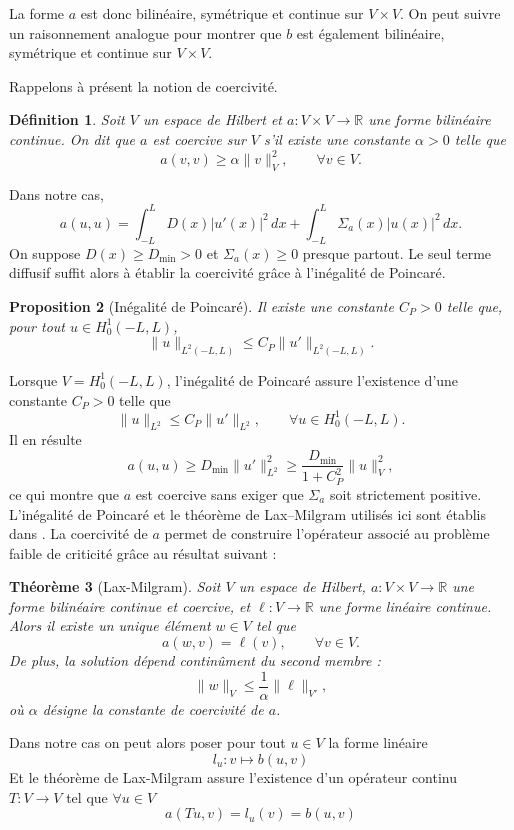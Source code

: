 \documentclass{article}
\newtheorem{theorem}{Théorème}[section]
\newtheorem{definition}[theorem]{Définition}
\newtheorem{proposition}[theorem]{Proposition}
\begin{document}
La forme $a$ est donc bilinéaire, symétrique et continue sur $V\times V$. On peut suivre un raisonnement analogue pour montrer que $b$ est également bilinéaire, symétrique et continue sur $V\times V$.

\medskip
Rappelons à présent la notion de coercivité. 
\begin{definition} 
    Soit $V$ un espace de Hilbert et $a : V\times V \rightarrow \mathbb{R}$ une forme bilinéaire continue. On dit que $a$ est coercive sur $V$ s'il existe une constante $\alpha>0$ telle que 
    \[ a(v,v)\ge \alpha \|v\|_V^2, \qquad \forall v\in V. \] 
\end{definition} 

Dans notre cas,
\[
a(u,u)=\int_{-L}^{L}D(x)|u'(x)|^2\,dx
+\int_{-L}^{L}\Sigma_a(x)|u(x)|^2\,dx.
\]
On suppose $D(x)\geq D_{\min}>0$ et $\Sigma_a(x)\geq0$ presque partout. Le seul terme diffusif suffit alors à établir la coercivité grâce à l'inégalité de Poincaré.

\begin{proposition}[Inégalité de Poincaré] 
Il existe une constante $C_P>0$ telle que, pour tout $u\in H_0^1(-L,L)$, 
\[ \|u\|_{L^2(-L,L)} \leq C_P \|u'\|_{L^2(-L,L)}. \] 
\end{proposition}


Lorsque $V=H_0^1(-L,L)$, l'inégalité de Poincaré assure l'existence d'une constante $C_P>0$ telle que
\[ \|u\|_{L^2}\le C_P \|u'\|_{L^2}, \qquad \forall u\in H_0^1(-L,L). \] 
Il en résulte
\[
a(u,u)\geq D_{\min}\|u'\|_{L^2}^2
\geq \frac{D_{\min}}{1+C_P^2}\|u\|_V^2,
\]
ce qui montre que $a$ est coercive sans exiger que $\Sigma_a$ soit strictement positive. L'inégalité de Poincaré et le théorème de Lax--Milgram utilisés ici sont établis dans \textcite{Brezis2011}.
La coercivité de $a$ permet de construire l'opérateur associé au problème faible de criticité grâce au résultat suivant :

\begin{theorem}[Lax-Milgram] 
    Soit $V$ un espace de Hilbert, $a : V\times V \to \mathbb{R}$ une forme bilinéaire continue et coercive, et $\ell : V \to \mathbb{R}$ une forme linéaire continue. 
    Alors il existe un unique élément $w\in V$ tel que 
    \[ a(w,v)=\ell(v), \qquad \forall v\in V. \] 
    De plus, la solution dépend continûment du second membre : 
    \[ \|w\|_V \le \frac{1}{\alpha}\|\ell\|_{V'}, \] 
    où $\alpha$ désigne la constante de coercivité de $a$.
\end{theorem}

Dans notre cas on peut alors poser pour tout $u\in V$ la forme linéaire 
\[
l_u :v \mapsto b(u,v)
\]
Et le théorème de Lax-Milgram assure l'existence d'un opérateur continu $T: V \to V$ tel que $\forall u \in V$
\begin{equation}
    a(Tu,v) = l_u(v) = b(u,v)
\end{equation}
\end{document}
